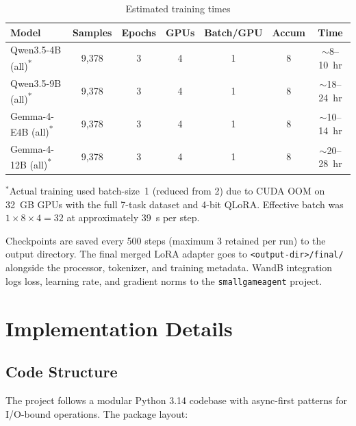 \documentclass[11pt,a4paper]{article}
\begin{document}
\begin{table}[H]
\centering
\caption{Estimated training times}
\label{tab:train_times}
\begin{tabular}{@{}lcccccc@{}}
\toprule
\textbf{Model} & \textbf{Samples} & \textbf{Epochs} & \textbf{GPUs} & \textbf{Batch/GPU} & \textbf{Accum} & \textbf{Time} \\
\midrule
Qwen3.5-4B (all)\textsuperscript{*}   & 9,378  & 3 & 4 & 1 & 8 & $\sim$8--10~hr \\
Qwen3.5-9B (all)\textsuperscript{*}   & 9,378  & 3 & 4 & 1 & 8 & $\sim$18--24~hr \\
Gemma-4-E4B (all)\textsuperscript{*} & 9,378  & 3 & 4 & 1 & 8 & $\sim$10--14~hr \\
Gemma-4-12B (all)\textsuperscript{*} & 9,378  & 3 & 4 & 1 & 8 & $\sim$20--28~hr \\
\bottomrule
\end{tabular}
\par\smallskip
\noindent\scriptsize $^*$Actual training used batch-size~1 (reduced from 2) due to CUDA OOM on 32~GB GPUs with the full 7-task dataset and 4-bit QLoRA. Effective batch was $1 \times 8 \times 4 = 32$ at approximately 39~s per step.
\end{table}

Checkpoints are saved every 500 steps (maximum 3 retained per run) to the output directory. The final merged LoRA adapter goes to \texttt{<output-dir>/final/} alongside the processor, tokenizer, and training metadata. WandB integration logs loss, learning rate, and gradient norms to the \texttt{smallgameagent} project.

\section{Implementation Details}

\subsection{Code Structure}

The project follows a modular Python 3.14 codebase with async-first patterns for I/O-bound operations. The package layout:
\end{document}
